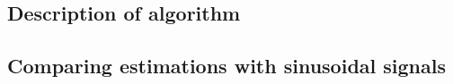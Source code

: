 
\subsection{Description of algorithm}

\subsection{Comparing estimations with sinusoidal signals}

